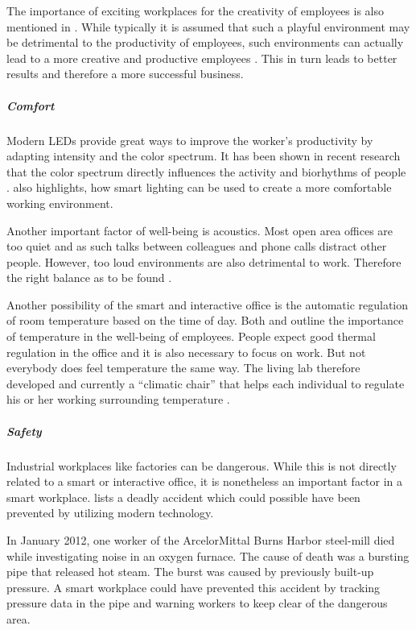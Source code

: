 The importance of exciting workplaces for the creativity of employees is also mentioned in 
\cite{roomzilla3}. While typically it is assumed that such a playful environment may be detrimental 
to the productivity of employees, such environments can actually lead to a more creative and 
productive employees \cite{metroffice}. This in turn leads to better results and therefore a more 
successful business.



\subparagraph{Comfort}\label{sec:sda-comfort}
Modern LEDs provide great ways to improve the worker's productivity by adapting intensity and the 
color spectrum. It has been shown in recent research that the color spectrum directly influences the 
activity and biorhythms of people  \cite{living-lab}. \cite{iotagenda} also highlights, how smart 
lighting can be used to create a more comfortable working environment.

Another important factor of well-being is acoustics. Most open area offices are too quiet and as 
such talks between colleagues and phone calls distract other people. However, too loud environments 
are also detrimental to work. Therefore the right balance as to be found \cite{living-lab}. 

Another possibility of the smart and interactive office is the automatic regulation of room 
temperature based on the time of day. Both \cite{iotagenda} and \cite{living-lab} outline the 
importance of temperature in the well-being of employees. People expect good thermal regulation in 
the office and it is also necessary to focus on work. But not everybody does feel temperature the 
same way. The living lab therefore developed and currently a ``climatic chair'' that helps each 
individual to regulate his or her working surrounding temperature \cite{living-lab}.


\subparagraph{Safety}\label{sec:sda-safety}
Industrial workplaces like factories can be dangerous. While this is not directly related to a smart 
or interactive office, it is nonetheless an important factor in a smart workplace. \cite{sda-wired} 
lists a deadly accident which could possible have been prevented by utilizing modern technology.

In January 2012, one worker of the ArcelorMittal Burns Harbor steel-mill died while investigating 
noise in an oxygen furnace. The cause of death was a bursting pipe that released hot steam. The 
burst was caused by previously built-up pressure. A smart workplace could have prevented this 
accident by tracking pressure data in the pipe and warning workers to keep clear of the dangerous 
area.

